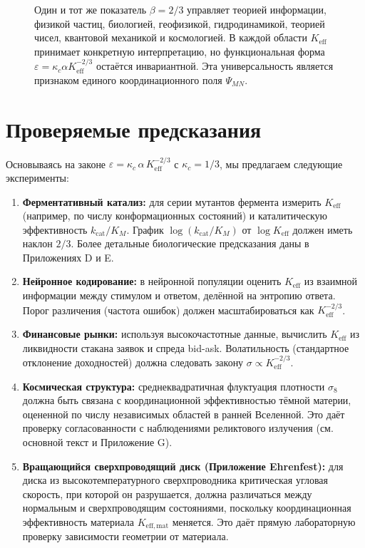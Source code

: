 \documentclass[12pt]{article}
\newcommand{\Keff}{K_{\mathrm{eff}}}
\newcommand{\eps}{\varepsilon}
\newcommand{\kappac}{\kappa_c}
\begin{document}
\begin{figure}[H]
		\caption{Один и тот же показатель \(\beta = 2/3\) управляет теорией информации, физикой частиц, биологией, геофизикой, гидродинамикой, теорией чисел, квантовой механикой и космологией. В каждой области \(K_{\mathrm{eff}}\) принимает конкретную интерпретацию, но функциональная форма \(\varepsilon = \kappa_c \alpha K_{\mathrm{eff}}^{-2/3}\) остаётся инвариантной. Эта универсальность является признаком единого координационного поля \(\Psi_{MN}\).}
		\label{fig:unified-beta}
	\end{figure}
	
	\section{Проверяемые предсказания}
	\label{sec:predictions}
	
	Основываясь на законе \(\eps = \kappac\,\alpha\,\Keff^{-2/3}\) с \(\kappac = 1/3\), мы предлагаем следующие эксперименты:
	
	\begin{enumerate}
		\item \textbf{Ферментативный катализ:} для серии мутантов фермента измерить \(\Keff\) (например, по числу конформационных состояний) и каталитическую эффективность \(k_{\text{cat}}/K_M\). График \(\log(k_{\text{cat}}/K_M)\) от \(\log \Keff\) должен иметь наклон \(2/3\). Более детальные биологические предсказания даны в Приложениях D и E.
		\item \textbf{Нейронное кодирование:} в нейронной популяции оценить \(\Keff\) из взаимной информации между стимулом и ответом, делённой на энтропию ответа. Порог различения (частота ошибок) должен масштабироваться как \(\Keff^{-2/3}\).
		\item \textbf{Финансовые рынки:} используя высокочастотные данные, вычислить \(\Keff\) из ликвидности стакана заявок и спреда bid-ask. Волатильность (стандартное отклонение доходностей) должна следовать закону \(\sigma \propto \Keff^{-2/3}\).
		\item \textbf{Космическая структура:} среднеквадратичная флуктуация плотности \(\sigma_8\) должна быть связана с координационной эффективностью тёмной материи, оцененной по числу независимых областей в ранней Вселенной. Это даёт проверку согласованности с наблюдениями реликтового излучения (см. основной текст и Приложение G).
		\item \textbf{Вращающийся сверхпроводящий диск (Приложение Ehrenfest):} для диска из высокотемпературного сверхпроводника критическая угловая скорость, при которой он разрушается, должна различаться между нормальным и сверхпроводящим состояниями, поскольку координационная эффективность материала \(K_{\mathrm{eff,mat}}\) меняется. Это даёт прямую лабораторную проверку зависимости геометрии от материала.
	\end{enumerate}
	
\end{document}
